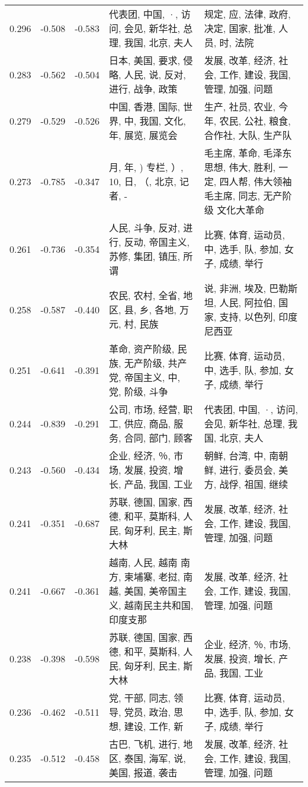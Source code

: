 \begin{tabular}{cccp{5cm}p{5cm}}
0.296 & -0.508 & -0.583 & 代表团, 中国, ·, 访问, 会见, 新华社, 总理, 我国, 北京, 夫人 & 规定, 应, 法律, 政府, 决定, 国家, 批准, 人员, 时, 法院 \\
0.283 & -0.562 & -0.504 & 日本, 美国, 要求, 侵略, 人民, 说, 反对, 进行, 战争, 政策 & 发展, 改革, 经济, 社会, 工作, 建设, 我国, 管理, 加强, 问题 \\
0.279 & -0.529 & -0.526 & 中国, 香港, 国际, 世界, 中, 我国, 文化, 年, 展览, 展览会 & 生产, 社员, 农业, 今年, 农民, 公社, 粮食, 合作社, 大队, 生产队 \\
0.273 & -0.785 & -0.347 & 月, 年, ) 专栏, ）, 10, 日, （, 北京, 记者, - & 毛主席, 革命, 毛泽东思想, 伟大, 胜利, 一定, 四人帮, 伟大领袖 毛主席, 同志, 无产阶级 文化大革命 \\
0.261 & -0.736 & -0.354 & 人民, 斗争, 反对, 进行, 反动, 帝国主义, 苏修, 集团, 镇压, 所谓 & 比赛, 体育, 运动员, 中, 选手, 队, 参加, 女子, 成绩, 举行 \\
0.258 & -0.587 & -0.440 & 农民, 农村, 全省, 地区, 县, 乡, 各地, 万元, 村, 民族 & 说, 非洲, 埃及, 巴勒斯坦, 人民, 阿拉伯, 国家, 支持, 以色列, 印度尼西亚 \\
0.251 & -0.641 & -0.391 & 革命, 资产阶级, 民族, 无产阶级, 共产党, 帝国主义, 中, 党, 阶级, 斗争 & 比赛, 体育, 运动员, 中, 选手, 队, 参加, 女子, 成绩, 举行 \\
0.244 & -0.839 & -0.291 & 公司, 市场, 经营, 职工, 供应, 商品, 服务, 合同, 部门, 顾客 & 代表团, 中国, ·, 访问, 会见, 新华社, 总理, 我国, 北京, 夫人 \\
0.243 & -0.560 & -0.434 & 企业, 经济, ％, 市场, 发展, 投资, 增长, 产品, 我国, 工业 & 朝鲜, 台湾, 中, 南朝鲜, 进行, 委员会, 美方, 战俘, 祖国, 继续 \\
0.241 & -0.351 & -0.687 & 苏联, 德国, 国家, 西德, 和平, 莫斯科, 人民, 匈牙利, 民主, 斯大林 & 发展, 改革, 经济, 社会, 工作, 建设, 我国, 管理, 加强, 问题 \\
0.241 & -0.667 & -0.361 & 越南, 人民, 越南 南方, 柬埔寨, 老挝, 南越, 美国, 美帝国主义, 越南民主共和国, 印度支那 & 发展, 改革, 经济, 社会, 工作, 建设, 我国, 管理, 加强, 问题 \\
0.238 & -0.398 & -0.598 & 苏联, 德国, 国家, 西德, 和平, 莫斯科, 人民, 匈牙利, 民主, 斯大林 & 企业, 经济, ％, 市场, 发展, 投资, 增长, 产品, 我国, 工业 \\
0.236 & -0.462 & -0.511 & 党, 干部, 同志, 领导, 党员, 政治, 思想, 建设, 工作, 新 & 比赛, 体育, 运动员, 中, 选手, 队, 参加, 女子, 成绩, 举行 \\
0.235 & -0.512 & -0.458 & 古巴, 飞机, 进行, 地区, 泰国, 海军, 说, 美国, 报道, 袭击 & 发展, 改革, 经济, 社会, 工作, 建设, 我国, 管理, 加强, 问题 \\

\end{tabular}
